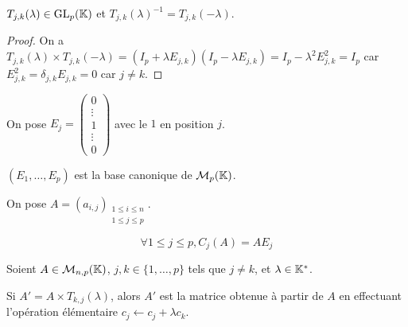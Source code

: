 \documentclass[12pt, a4paper]{report}
\begin{document}
\begin{property}
    $T_{j,k}(\lambda) \in \mathrm{GL}_p(\mathbb{K})$ et $T_{j,k}(\lambda)^{-1} = T_{j,k}(-\lambda)$.
\end{property}

\begin{proof}
    On a $T_{j,k}(\lambda) \times T_{j,k}(-\lambda) = (I_p + \lambda E_{j,k})(I_p - \lambda E_{j,k}) = I_p - \lambda^2 E_{j,k}^2 = I_p$ car $E_{j,k}^2 = \delta_{j,k}E_{j,k} = 0$ car $j \ne k$.
\end{proof}

\begin{remark}
    On pose $E_j = \left(\begin{matrix} 0 \\ \vdots \\ 1 \\ \vdots \\ 0 \end{matrix}\right)$ avec le $1$ en position $j$.

    $(E_1,\dots,E_p)$ est la base canonique de $\mathcal M_p(\mathbb{K})$.

    On pose $A = (a_{i,j})_{\substack{1 \leq i \leq n \\ 1 \leq j \leq p}}$.

    $$\forall 1 \le j \le p, C_j(A) = A E_j$$
\end{remark}

\begin{property}
    Soient $A \in \mathcal M_{n,p}(\mathbb{K})$, $j,k \in \{1,\dots,p\}$ tels que $j \ne k$, et $\lambda \in \mathbb{K}^*$.

    Si $A' = A \times T_{k,j}(\lambda)$, alors $A'$ est la matrice obtenue à partir de $A$ en effectuant l'opération élémentaire $c_j \leftarrow c_j + \lambda c_k$.
\end{property}
\end{document}

